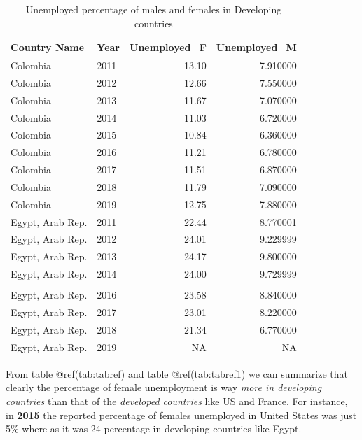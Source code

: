 \documentclass[
]{article}
\begin{document}
\begin{table}

\caption{\label{tab:tabref1}Unemployed percentage of males and females in Developing countries}
\centering
\begin{tabular}[t]{l|l|r|r}
\hline
Country Name & Year & Unemployed\_F & Unemployed\_M\\
\hline
Colombia & 2011 & 13.10 & 7.910000\\
\hline
Colombia & 2012 & 12.66 & 7.550000\\
\hline
Colombia & 2013 & 11.67 & 7.070000\\
\hline
Colombia & 2014 & 11.03 & 6.720000\\
\hline
Colombia & 2015 & 10.84 & 6.360000\\
\hline
Colombia & 2016 & 11.21 & 6.780000\\
\hline
Colombia & 2017 & 11.51 & 6.870000\\
\hline
Colombia & 2018 & 11.79 & 7.090000\\
\hline
Colombia & 2019 & 12.75 & 7.880000\\
\hline
Egypt, Arab Rep. & 2011 & 22.44 & 8.770001\\
\hline
Egypt, Arab Rep. & 2012 & 24.01 & 9.229999\\
\hline
Egypt, Arab Rep. & 2013 & 24.17 & 9.800000\\
\hline
Egypt, Arab Rep. & 2014 & 24.00 & 9.729999\\
\hline
\cellcolor{red}{\textcolor{white}{\textbf{Egypt, Arab Rep.}}} & \cellcolor{red}{\textcolor{white}{\textbf{2015}}} & \cellcolor{red}{\textcolor{white}{\textbf{24.81}}} & \cellcolor{red}{\textcolor{white}{\textbf{9.390000}}}\\
\hline
Egypt, Arab Rep. & 2016 & 23.58 & 8.840000\\
\hline
Egypt, Arab Rep. & 2017 & 23.01 & 8.220000\\
\hline
Egypt, Arab Rep. & 2018 & 21.34 & 6.770000\\
\hline
Egypt, Arab Rep. & 2019 & NA & NA\\
\hline
\end{tabular}
\end{table}

From table @ref(tab:tabref) and table @ref(tab:tabref1) we can summarize
that clearly the percentage of female unemployment is way \emph{more in
developing countries} than that of the \emph{developed countries} like
US and France. For instance, in \textbf{2015} the reported percentage of
females unemployed in United States was just 5\% where as it was 24
percentage in developing countries like Egypt.
\end{document}
